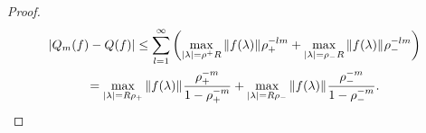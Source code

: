 \begin{proof}
    \begin{multline*}
        |Q_m(f) - Q(f)|
        \leq
        \sum_{l=1}^\infty
            {\left ( 
                \max_{|\lambda| = \rho^+R}
                    {\left \| f(\lambda) \right \|}_{}
                    \rho_+^{-l m}
                +
                \max_{|\lambda| = \rho_-R}
                    {\left \| f(\lambda) \right \|}_{}
                    \rho_-^{-l m}
             \right )} \\
        =
        \max_{{\left | \lambda \right |} = R \rho_+}
            {\left \| f(\lambda) \right \|}_{}
        \frac{\rho_+^{-m}}{1 - \rho_+^{-m}}
        +
        \max_{{\left | \lambda \right |} = R \rho_-}
            {\left \| f(\lambda) \right \|}_{}
        \frac{\rho_-^{-m}}{1 - \rho_-^{-m}}.
    \end{multline*}
    
\end{proof}
